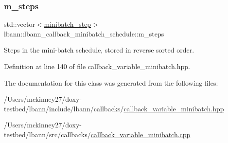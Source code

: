 \subsubsection{\texorpdfstring{m\+\_\+steps}{m\_steps}}
{\footnotesize\ttfamily std\+::vector$<$\hyperlink{structlbann_1_1lbann__callback__minibatch__schedule_1_1minibatch__step}{minibatch\+\_\+step}$>$ lbann\+::lbann\+\_\+callback\+\_\+minibatch\+\_\+schedule\+::m\+\_\+steps\hspace{0.3cm}{\ttfamily [protected]}}



Steps in the mini-\/batch schedule, stored in reverse sorted order. 



Definition at line 140 of file callback\+\_\+variable\+\_\+minibatch.\+hpp.



The documentation for this class was generated from the following files\+:\begin{DoxyCompactItemize}
\item 
/\+Users/mckinney27/doxy-\/testbed/lbann/include/lbann/callbacks/\hyperlink{callback__variable__minibatch_8hpp}{callback\+\_\+variable\+\_\+minibatch.\+hpp}\item 
/\+Users/mckinney27/doxy-\/testbed/lbann/src/callbacks/\hyperlink{callback__variable__minibatch_8cpp}{callback\+\_\+variable\+\_\+minibatch.\+cpp}\end{DoxyCompactItemize}
